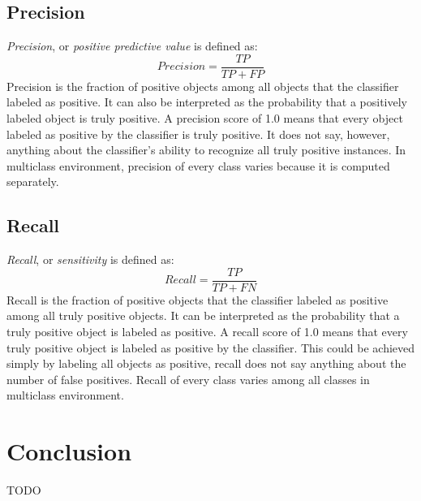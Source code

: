 \documentclass[11pt]{article}
\begin{document}
      \subsection{Precision}
        {\it Precision}, or {\it positive predictive value} is defined as:
        \begin{equation}
          Precision = \frac{TP}{TP + FP}
        \end{equation}
        Precision is the fraction of positive objects among all objects that the classifier labeled as positive. It can also be interpreted as the probability that a positively labeled object is truly positive. A precision score of 1.0 means that every object labeled as positive by the classifier is truly positive. It does not say, however, anything about the classifier's ability to recognize all truly positive instances. In multiclass environment, precision of every class varies because it is computed separately.
      \subsection{Recall}
        {\it Recall}, or {\it sensitivity} is defined as:
        \begin{equation}
          Recall = \frac{TP}{TP + FN}
        \end{equation}
        Recall is the fraction of positive objects that the classifier labeled as positive among all truly positive objects. It can be interpreted as the probability that a truly positive object is labeled as positive. A recall score of 1.0 means that every truly positive object is labeled as positive by the classifier. This could be achieved simply by labeling all objects as positive, recall does not say anything about the number of false positives. Recall of every class varies among all classes in multiclass environment.
  \newpage
  \section*{Conclusion}
    {\color{red}TODO}
  \newpage
  
\end{document}
